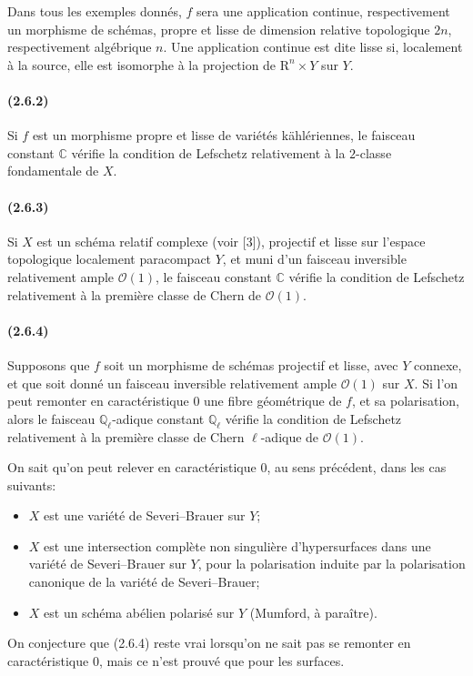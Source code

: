 \documentclass[10pt]{article}
\newcommand{\R}{\mathrm R}
\providecommand{\C}{\mathbb C}
\providecommand{\Ql}{\mathbb Q_\ell}
\begin{document}
Dans tous les exemples donnés, $f$ sera une application continue, respectivement un morphisme de schémas, propre et lisse de dimension relative topologique $2n$, respectivement algébrique $n$. Une application continue est dite lisse si, localement à la source, elle est isomorphe à la projection de $\R^n\times Y$ sur $Y$.

\paragraph{(2.6.2)} Si $f$ est un morphisme propre et lisse de variétés kählériennes, le faisceau constant $\C$ vérifie la condition de Lefschetz relativement à la $2$-classe fondamentale de $X$.

\paragraph{(2.6.3)} Si $X$ est un schéma relatif complexe (voir [3]), projectif et lisse sur l'espace topologique localement paracompact $Y$, et muni d'un faisceau inversible relativement ample $\mathcal O(1)$, le faisceau constant $\C$ vérifie la condition de Lefschetz relativement à la première classe de Chern de $\mathcal O(1)$.

\paragraph{(2.6.4)} Supposons que $f$ soit un morphisme de schémas projectif et lisse, avec $Y$ connexe, et que soit donné un faisceau inversible relativement ample $\mathcal O(1)$ sur $X$. Si l'on peut remonter en caractéristique $0$ une fibre géométrique de $f$, et sa polarisation, alors le faisceau $\Ql$-adique constant $\Ql$ vérifie la condition de Lefschetz relativement à la première classe de Chern $\ell$-adique de $\mathcal O(1)$.

On sait qu'on peut relever en caractéristique $0$, au sens précédent, dans les cas suivants:
\begin{itemize}
\item $X$ est une variété de Severi--Brauer sur $Y$;
\item $X$ est une intersection complète non singulière d'hypersurfaces dans une variété de Severi--Brauer sur $Y$, pour la polarisation induite par la polarisation canonique de la variété de Severi--Brauer;
\item $X$ est un schéma abélien polarisé sur $Y$ (Mumford, à paraître).
\end{itemize}
On conjecture que (2.6.4) reste vrai lorsqu'on ne sait pas se remonter en caractéristique $0$, mais ce n'est prouvé que pour les surfaces.
\end{document}
